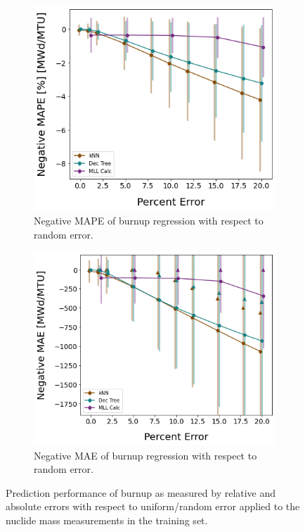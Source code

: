 \begin{figure}[!htb]
  \centering
  \begin{subfigure}[b]{0.48\textwidth}
    \centering
    \includegraphics[width=\textwidth]{./chapters/exp1/randerr_compare_nuc29_MAPE_burn.png}
    \caption{Negative \gls{MAPE} of burnup regression with respect to 
             random error.}
    \label{fig:burnmape}
  \end{subfigure}
  \hfill
  \begin{subfigure}[b]{0.5\textwidth}
    \centering
    \includegraphics[width=\textwidth]{./chapters/exp1/randerr_compare_nuc29_MAE_burn.png}
    \caption{Negative \gls{MAE} of burnup regression with respect to 
             random error.}
    \label{fig:burnmae}
  \end{subfigure}
  \caption[Prediction performance of burnup regression with increasing training 
           set error]
          {Prediction performance of burnup as measured by relative and 
           absolute errors with respect to uniform/random error applied to the 
           nuclide mass measurements in the training set.}
  \label{fig:randburn}
\end{figure}

